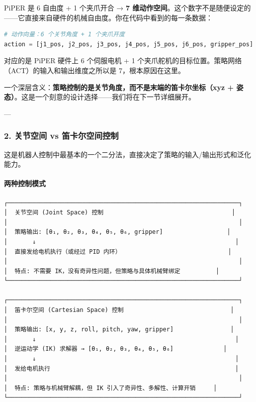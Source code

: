 \documentclass[UTF8,a4paper,11pt]{ctexart}
\begin{document}
PiPER 是 6 自由度 + 1 个夹爪开合 → \textbf{7 维动作空间}。这个数字不是随便设定的——它直接来自硬件的机械自由度。你在代码中看到的每一条数据：

\begin{lstlisting}[language=python]
# 动作向量：6 个关节角度 + 1 个夹爪开度
action = [j1_pos, j2_pos, j3_pos, j4_pos, j5_pos, j6_pos, gripper_pos]
\end{lstlisting}

对应的是 PiPER 硬件上 6 个伺服电机 + 1 个夹爪舵机的目标位置。策略网络（ACT）的输入和输出维度之所以是 7，根本原因在这里。

一个深层含义：\textbf{策略控制的是关节角度，而不是末端的笛卡尔坐标（xyz + 姿态）}。这是一个刻意的设计选择——我们将在下一节详细展开。

---

\subsubsection{2. 关节空间 vs 笛卡尔空间控制}

这是机器人控制中最基本的一个二分法，直接决定了策略的输入/输出形式和泛化能力。

\paragraph{两种控制模式}


\begin{lstlisting}[language=text]
┌─────────────────────────────────────────────────────────────────┐
│  关节空间 (Joint Space) 控制                                    │
│                                                                 │
│  策略输出: [θ₁, θ₂, θ₃, θ₄, θ₅, θ₆, gripper]                  │
│       ↓                                                        │
│  直接发给电机执行（或经过 PID 内环）                              │
│                                                                 │
│  特点: 不需要 IK，没有奇异性问题，但策略与具体机械臂绑定          │
└─────────────────────────────────────────────────────────────────┘

┌─────────────────────────────────────────────────────────────────┐
│  笛卡尔空间 (Cartesian Space) 控制                              │
│                                                                 │
│  策略输出: [x, y, z, roll, pitch, yaw, gripper]                │
│       ↓                                                        │
│  逆运动学 (IK) 求解器 → [θ₁, θ₂, θ₃, θ₄, θ₅, θ₆]              │
│       ↓                                                        │
│  发给电机执行                                                    │
│                                                                 │
│  特点: 策略与机械臂解耦，但 IK 引入了奇异性、多解性、计算开销     │
└─────────────────────────────────────────────────────────────────┘
\end{lstlisting}
\end{document}
